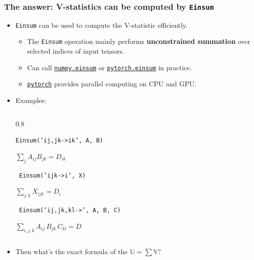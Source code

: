 \documentclass[9pt]{beamer}
\theoremstyle{mystyle}
\theoremstyle{mystyletwo}
\newcommand{\libref}[2]{\href{#2}{\texttt{#1}}}
\newcommand{\torch}{\libref{pytorch}{https://pytorch.org/}}
\newcommand{\numpyeinsum}{\libref{numpy.einsum}{https://numpy.org/doc/2.1/reference/generated/numpy.einsum.html}}
\newcommand{\torcheinsum}{\libref{pytorch.einsum}{https://pytorch.org/docs/stable/generated/torch.einsum.html}}
\begin{document}
\begin{frame}
\frametitle{The answer: V-statistics can be computed by \texttt{Einsum}}

    \begin{itemize}
        \item \texttt{Einsum} can be used to compute the V-statistic efficiently.
              \begin{itemize}
                    \item The \texttt{Einsum} operation mainly performs \textbf{unconstrained summation} over selected indices of input tensors.
                  \item Can call \numpyeinsum{} or \torcheinsum{} in practice.
                  \item \torch{} provides parallel computing on CPU and GPU.
              \end{itemize}
        \item Examples:
        \begin{columns}
            \begin{column}{0.8\textwidth}
                \centering
                              
                \texttt{\large Einsum('ij,jk->ik', A, B)}
                
                \large $  \sum_j A_{ij} B_{jk} = D_{ik}$
                        
                \vspace{0.4cm}
        
                
                \texttt{ \large Einsum('ijk->i', X)}
                
                \large$ \sum_{j,k} X_{ijk} = D_i $
                
                \vspace{0.4cm}
                
                \texttt{ \large Einsum('ij,jk,kl->', A, B, C)}
                
                \large $  \sum_{i,j,k} A_{ij} \, B_{jk} \, C_{kl} = D$
                        
                \vspace{0.4cm}
            \end{column}
        \end{columns}

\item Then what's the exact formula of the $ \mathbb{U} = \sum \mathbb{V}$?

    \end{itemize}

\end{frame}
\end{document}
